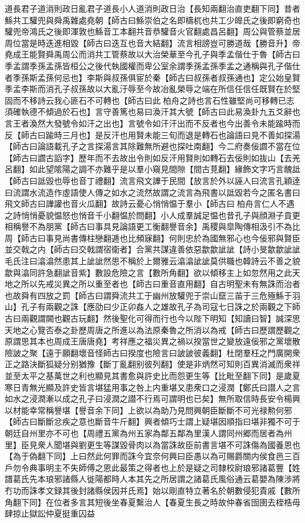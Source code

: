 道長君子道消則政日亂君子道長小人道消則政日治【長知兩翻治直吏翻下同】昔者鯀共工驩兜與舜禹雜處堯朝【師古曰鯀崇伯之名即檮杌也共工少皥氏之後即窮奇也驩兜帝鴻氏之後即渾敦也鯀音工本翻共音恭驩音火官翻處昌呂翻】周公與管蔡並居周位當是時迭進相毀【師古曰迭互也音大結翻】流言相謗豈可勝道哉【勝音升】帝堯成王能賢舜禹周公而消共工管蔡故以大治榮華至今孔子與季孟偕仕于魯【師古曰季孟謂季孫孟孫皆桓公之後代執國權而卑公室余謂季孫孟孫季孟之通稱與孔子偕仕者季孫斯孟孫何忌也】李斯與叔孫俱宦於秦【師古曰叔孫者叔孫通也】定公始皇賢季孟李斯而消孔子叔孫故以大亂汙辱至今故冶亂榮辱之端在所信任信任既賢在於堅固而不移詩云我心匪石不可轉也【師古曰此柏舟之詩也言石性雖堅尚可移轉已志須確執德不傾過於石也】言守善篤也易曰渙汗其大號【師古曰此易渙卦九五爻辭也言王者渙然大發號令如汗之出也】言號令如汗汗出而不反者也今出善令未能踰時而反【師古曰踰時三月也】是反汗也用賢未能三旬而退是轉石也論語曰見不善如探湯【師古曰論語載孔子之言探湯言其除難無所避也探吐南翻】今二府奏佞讇不當在位【師古曰讇古謟字】歷年而不去故出令則如反汗用賢則如轉石去佞則如抜山【去羌呂翻】如此望隂陽之調不亦難乎是以羣小窺見間隙【間古莧翻】緣飾文字巧言醜詆【師古曰詆毀也辱也音丁禮翻】流言飛文譁于民間【放言於外以誣人曰流言孔穎逹曰流謂水流造作虛語使人傳之如水之流然故謂之流言為飛書以詆毀若今之匿名書曰飛文師古曰譁讙也音火瓜翻】故詩云憂心悄悄愠于羣小【師古曰柏舟言仁人不遇之詩悄悄憂貌愠怒也悄音千小翻愠於問翻】小人成羣誠足愠也昔孔子與顔淵子貢更相稱譽不為朋黨【師古曰事具見論語更工衡翻譽音余】禹稷與皐陶傳相汲引不為比周【師古曰事見尚書傳柱戀翻逓也比頻寐翻】何則忠於為國無邪心也今佞邪與賢臣並交戟之内【師古曰交戟謂宿衛者】合黨共謀違善依惡歙歙訿訿【詩小旻歙歙訿訿毛氏注曰潝潝然患其上訿訿然思不稱於上爾雅云潝潝訿訿莫供職也韓詩云不善之貌歙與潝同許急翻訿音紫】數設危險之言【數所角翻】欲以傾移主上如忽然用之此天地之所以先戒災異之所以重至者也【師古曰重音直用翻】自古明聖未有無誅而治者也故舜有四放之罰【師古曰謂舜流共工于幽州放驩兜于崇山竄三苖于三危殛鯀于羽山】孔子有兩觀之誅【應劭曰少正卯姦人之雄故孔子為司寇七日誅之於兩觀之下師古曰兩觀謂闕也觀古玩翻】然後聖化可得而行也今以陛下明知【知讀曰智】誠深思天地之心覽否泰之卦歷周唐之所進以為法原秦魯之所消以為戒【師古曰歷謂歷觀之原謂思其本也周成王唐唐堯】考祥應之福災異之禍以揆當世之變放遠佞邪之黨壞散險詖之聚【遠于願翻壞音怪師古曰揆度也險言曰詖詖彼義翻】杜閉羣枉之門廣開衆正之路決斷狐疑分别猶豫【斷丁亂翻别彼列翻】使是非炳然可知則百異消滅而衆祥並至太平之基萬世之利也顯見其書愈與許史比而怨更生等【比毗至翻下同】是歲夏寒日青無光顯及許史皆言堪猛用事之咎上内重堪又患衆口之浸潤【鄭氏曰譛人之言如水之浸潤漸以成之孔子曰浸潤之譛不行焉可謂明也已矣】無所取信時長安令楊興以材能幸常稱譽堪【譽音余下同】上欲以為助乃見問興朝臣斷斷不可光禄勲何邪【師古曰斷斷忿疾之意也斷音牛斤翻】興者傾巧士謂上疑堪因順指曰堪非獨不可于朝廷自州里亦不可也【周禮五黨為州五家為鄰五鄰為里漢人謂同州郷而居者為州里】臣見衆人聞堪與劉更生等謀毀骨肉以為當誅故臣前書言堪不可誅傷為國養恩也【為于偽翻下同】上曰然此何罪而誅今宜奈何興曰臣愚以為可賜爵關内侯食邑三百戶勿令典事明主不失師傅之恩此最策之得者也上於是疑之司隸校尉琅邪諸葛豐【姓譜葛氏先本琅邪諸縣人徙陽都時人本其先之所居謂之諸葛氏風俗通云葛嬰為陳涉將冇功而誅孝文録其後封諸縣侯因并氏焉】始以剛直特立著名於朝數侵犯貴戚【數所角翻下同】在位者多言其短後坐春夏繫治人【春夏生長之時故仲春省囹圉去桎梏毋肆掠止獄訟仲夏挺重囚益